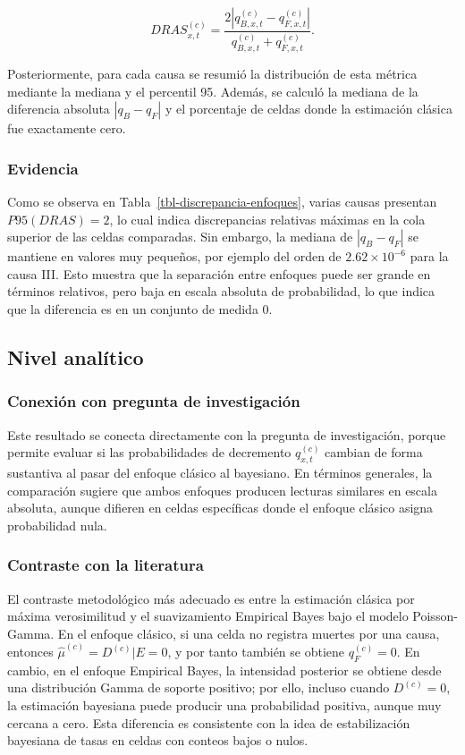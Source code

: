 \documentclass[
  spanish,
  letterpaper,
  DIV=11,
  numbers=noendperiod]{scrartcl}
\begin{document}
\[
DRAS_{x,t}^{(c)}
=
\frac{
2\left|
q_{B,x,t}^{(c)}-q_{F,x,t}^{(c)}
\right|
}{
q_{B,x,t}^{(c)}+q_{F,x,t}^{(c)}
}.
\]

Posteriormente, para cada causa se resumió la distribución de esta
métrica mediante la mediana y el percentil 95. Además, se calculó la
mediana de la diferencia absoluta \(|q_B-q_F|\) y el porcentaje de
celdas donde la estimación clásica fue exactamente cero.

\subsubsection{Evidencia}\label{evidencia}

Como se observa en Tabla~\ref{tbl-discrepancia-enfoques}, varias causas
presentan \(P95(DRAS)=2\), lo cual indica discrepancias relativas
máximas en la cola superior de las celdas comparadas. Sin embargo, la
mediana de \(|q_B-q_F|\) se mantiene en valores muy pequeños, por
ejemplo del orden de \(2.62\times 10^{-6}\) para la causa III. Esto
muestra que la separación entre enfoques puede ser grande en términos
relativos, pero baja en escala absoluta de probabilidad, lo que indica
que la diferencia es en un conjunto de medida 0.

\subsection{Nivel analítico}\label{nivel-analuxedtico}

\subsubsection{Conexión con pregunta de
investigación}\label{conexiuxf3n-con-pregunta-de-investigaciuxf3n}

Este resultado se conecta directamente con la pregunta de investigación,
porque permite evaluar si las probabilidades de decremento
\(q_{x,t}^{(c)}\) cambian de forma sustantiva al pasar del enfoque
clásico al bayesiano. En términos generales, la comparación sugiere que
ambos enfoques producen lecturas similares en escala absoluta, aunque
difieren en celdas específicas donde el enfoque clásico asigna
probabilidad nula.

\subsubsection{Contraste con la
literatura}\label{contraste-con-la-literatura}

El contraste metodológico más adecuado es entre la estimación clásica
por máxima verosimilitud y el suavizamiento Empirical Bayes bajo el
modelo Poisson-Gamma. En el enfoque clásico, si una celda no registra
muertes por una causa, entonces \(\widehat{\mu}^{(c)}=D^{(c)}|E=0\), y
por tanto también se obtiene \(q_F^{(c)}=0\). En cambio, en el enfoque
Empirical Bayes, la intensidad posterior se obtiene desde una
distribución Gamma de soporte positivo; por ello, incluso cuando
\(D^{(c)}=0\), la estimación bayesiana puede producir una probabilidad
positiva, aunque muy cercana a cero. Esta diferencia es consistente con
la idea de estabilización bayesiana de tasas en celdas con conteos bajos
o nulos.
\end{document}
